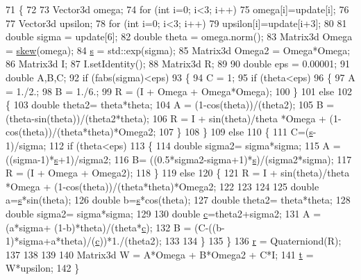 \begin{DoxyCode}
71     \{
72 
73       Vector3d omega;
74       \textcolor{keywordflow}{for} (\textcolor{keywordtype}{int} i=0; i<3; i++)
75         omega[i]=update[i];
76 
77       Vector3d upsilon;
78       \textcolor{keywordflow}{for} (\textcolor{keywordtype}{int} i=0; i<3; i++)
79         upsilon[i]=update[i+3];
80 
81       \textcolor{keywordtype}{double} sigma = update[6];
82       \textcolor{keywordtype}{double} theta = omega.norm();
83       Matrix3d Omega = \hyperlink{namespaceg2o_adb3143a37b9bc002f4f7b6423061ef81}{skew}(omega);
84       \hyperlink{structg2o_1_1Sim3_a2cad7c49340494d4bdd28a497e4cb486}{s} = std::exp(sigma);
85       Matrix3d Omega2 = Omega*Omega;
86       Matrix3d I;
87       I.setIdentity();
88       Matrix3d R;
89 
90       \textcolor{keywordtype}{double} eps = 0.00001;
91       \textcolor{keywordtype}{double} A,B,C;
92       \textcolor{keywordflow}{if} (fabs(sigma)<eps)
93       \{
94         C = 1;
95         \textcolor{keywordflow}{if} (theta<eps)
96         \{
97           A = 1./2.;
98           B = 1./6.;
99           R = (I + Omega + Omega*Omega);
100         \}
101         \textcolor{keywordflow}{else}
102         \{
103           \textcolor{keywordtype}{double} theta2= theta*theta;
104           A = (1-cos(theta))/(theta2);
105           B = (theta-sin(theta))/(theta2*theta);
106           R = I + sin(theta)/theta *Omega + (1-cos(theta))/(theta*theta)*Omega2;
107         \}
108       \}
109       \textcolor{keywordflow}{else}
110       \{
111         C=(\hyperlink{structg2o_1_1Sim3_a2cad7c49340494d4bdd28a497e4cb486}{s}-1)/sigma;
112         \textcolor{keywordflow}{if} (theta<eps)
113         \{
114           \textcolor{keywordtype}{double} sigma2= sigma*sigma;
115           A = ((sigma-1)*\hyperlink{structg2o_1_1Sim3_a2cad7c49340494d4bdd28a497e4cb486}{s}+1)/sigma2;
116           B= ((0.5*sigma2-sigma+1)*\hyperlink{structg2o_1_1Sim3_a2cad7c49340494d4bdd28a497e4cb486}{s})/(sigma2*sigma);
117           R = (I + Omega + Omega2);
118         \}
119         \textcolor{keywordflow}{else}
120         \{
121           R = I + sin(theta)/theta *Omega + (1-cos(theta))/(theta*theta)*Omega2;
122 
123 
124 
125           \textcolor{keywordtype}{double} a=\hyperlink{structg2o_1_1Sim3_a2cad7c49340494d4bdd28a497e4cb486}{s}*sin(theta);
126           \textcolor{keywordtype}{double} b=\hyperlink{structg2o_1_1Sim3_a2cad7c49340494d4bdd28a497e4cb486}{s}*cos(theta);
127           \textcolor{keywordtype}{double} theta2= theta*theta;
128           \textcolor{keywordtype}{double} sigma2= sigma*sigma;
129 
130           \textcolor{keywordtype}{double} \hyperlink{sparse__block__matrix_8hpp_a4e1e0e72dd773439e333c84dd762a9c3}{c}=theta2+sigma2;
131           A = (a*sigma+ (1-b)*theta)/(theta*\hyperlink{sparse__block__matrix_8hpp_a4e1e0e72dd773439e333c84dd762a9c3}{c});
132           B = (C-((b-1)*sigma+a*theta)/(\hyperlink{sparse__block__matrix_8hpp_a4e1e0e72dd773439e333c84dd762a9c3}{c}))*1./(theta2);
133 
134         \}
135       \}
136       \hyperlink{structg2o_1_1Sim3_a55dbe5c6ffe22526f20e05f0c23aa832}{r} = Quaterniond(R);
137 
138 
139 
140       Matrix3d W = A*Omega + B*Omega2 + C*I;
141       \hyperlink{structg2o_1_1Sim3_a3ef879fb13b88732428bd2f2a558d11c}{t} = W*upsilon;
142     \}
\end{DoxyCode}


